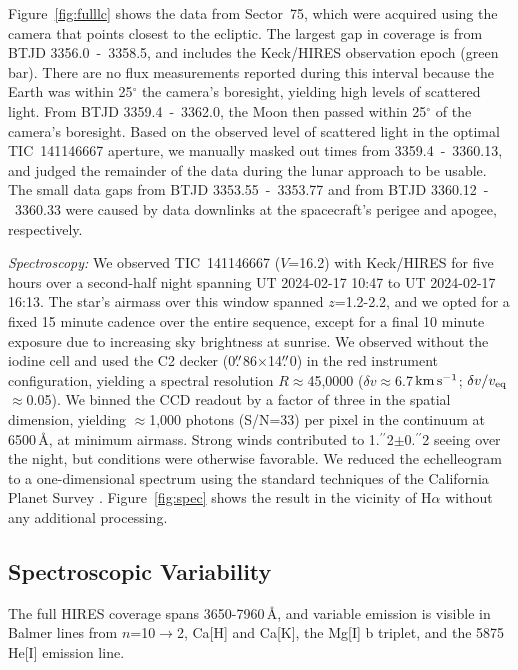 \documentclass{nature3}
\newcommand{\farcs}{\mbox{\ensuremath{.\!\!^{\prime\prime}}}}%
\newcommand{\kms}{\ensuremath{\rm km\,s^{-1}}}
\begin{document}
\begin{methods}
Figure~\ref{fig:fulllc} shows the data from Sector~75, which were
acquired using the camera that points closest to the ecliptic.  The
largest gap in coverage is from BTJD 3356.0~-~3358.5, and includes
the Keck/HIRES observation epoch (green bar).   There are no flux
measurements reported during this interval because the Earth was
within 25$^\circ$ the camera's boresight, yielding high levels of
scattered light.  From BTJD 3359.4~-~3362.0, the Moon then passed
within 25$^\circ$ of the camera's boresight.  Based on the observed
level of scattered light in the optimal TIC~141146667 aperture, we
manually masked out times from 3359.4~-~3360.13, and judged the
remainder of the data during the lunar approach to be usable.  The
small data gaps from BTJD 3353.55~-~3353.77 and from BTJD
3360.12~-~3360.33 were caused by data downlinks at the spacecraft's
perigee and apogee, respectively.

{\it Spectroscopy:}
We observed TIC~141146667 ($V$=16.2) with Keck/HIRES for five hours over a
second-half night spanning UT 2024-02-17 10:47 to UT 2024-02-17
16:13.  The star's airmass over this window spanned $z$=1.2-2.2, and
we opted for a fixed 15 minute cadence over the entire sequence,
except for a final 10 minute exposure due to increasing sky
brightness at sunrise.  We observed without the iodine cell and used
the C2 decker (0$\farcs$86$\times$14$\farcs$0) in the red instrument
configuration, yielding a spectral resolution $R$$\approx$45{,}0000
($\delta v$$\approx$6.7\,\kms; $\delta v / v_{\rm
eq}$$\approx$0.05).  We binned the CCD readout by a factor of three
in the spatial dimension, yielding $\approx$1,000 photons (S/N=33)
per pixel in the continuum at 6500\,\AA, at minimum airmass.  Strong
winds contributed to 1\farcs2$\pm$0\farcs2 seeing over the night,
but conditions were otherwise favorable.  We reduced the
echelleogram to a one-dimensional spectrum using the standard
techniques of the California Planet Survey \cite{Howard2010}.
Figure~\ref{fig:spec} shows the result in the vicinity of H$\alpha$
without any additional processing.


\subsection{Spectroscopic Variability}

The full HIRES coverage spans 3650-7960\,\AA, and variable
  emission is visible in Balmer lines from $n$=10$\rightarrow$2, Ca[H]
  and Ca[K], the Mg[I] b triplet, and the 5875 He[I] emission line.


\end{methods}
\end{document}
